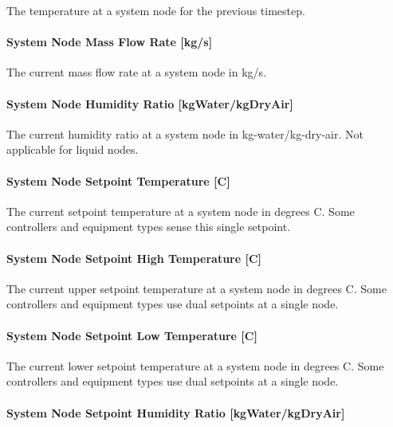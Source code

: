 The temperature at a system node for the previous timestep.

\paragraph{System Node Mass Flow Rate {[}kg/s{]}}\label{system-node-mass-flow-rate-kgs}

The current mass flow rate at a system node in kg/s.

\paragraph{System Node Humidity Ratio {[}kgWater/kgDryAir{]}}\label{system-node-humidity-ratio-kgwaterkgdryair}

The current humidity ratio at a system node in kg-water/kg-dry-air. Not applicable for liquid nodes.

\paragraph{System Node Setpoint Temperature {[}C{]}}\label{system-node-setpoint-temperature-c}

The current setpoint temperature at a system node in degrees C. Some controllers and equipment types sense this single setpoint.

\paragraph{System Node Setpoint High Temperature {[}C{]}}\label{system-node-setpoint-high-temperature-c}

The current upper setpoint temperature at a system node in degrees C. Some controllers and equipment types use dual setpoints at a single node.

\paragraph{System Node Setpoint Low Temperature {[}C{]}}\label{system-node-setpoint-low-temperature-c}

The current lower setpoint temperature at a system node in degrees C. Some controllers and equipment types use dual setpoints at a single node.

\paragraph{System Node Setpoint Humidity Ratio {[}kgWater/kgDryAir{]}}\label{system-node-setpoint-humidity-ratio-kgwaterkgdryair}


